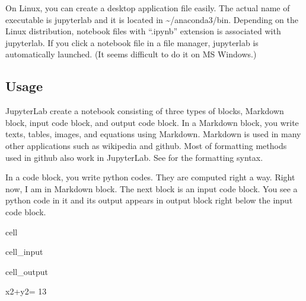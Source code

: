 \documentclass[letterpaper,10pt,english]{jupyterBook}
\begin{document}
\sphinxAtStartPar
On Linux, you can create a desktop application file easily.  The actual name of executable is jupyter\sphinxhyphen{}lab and it is located in \textasciitilde{}/anaconda3/bin.  Depending on the Linux distribution, notebook files with “.ipynb” extension is associated with jupyter\sphinxhyphen{}lab.  If you click a notebook file in a file manager,  jupyter\sphinxhyphen{}lab is automatically launched. (It seems difficult to do it on MS Windows.)


\subsection{Usage}
\label{\detokenize{preparation/jupyter:usage}}
\sphinxAtStartPar
JupyterLab create a notebook consisting of three types of blocks, Markdown block, input code block, and output code block.  In a Markdown block, you write texts, tables, images, and equations using Markdown. Markdown is used in many other applications such as wikipedia and github. Most of formatting methods used in github also work in JupyterLab.  See  for the formatting syntax.

\sphinxAtStartPar
In a code block, you write python codes. They are computed right a way. Right now, I am in Markdown block.  The next block is an input code block.  You see a python code in it and its output appears in output block right below the input code block.

\begin{sphinxuseclass}{cell}\begin{sphinxVerbatimInput}

\begin{sphinxuseclass}{cell_input}
\begin{sphinxVerbatim}[commandchars=\\\{\}]
\end{sphinxVerbatim}

\end{sphinxuseclass}\end{sphinxVerbatimInput}
\begin{sphinxVerbatimOutput}

\begin{sphinxuseclass}{cell_output}
\begin{sphinxVerbatim}[commandchars=\\\{\}]
x\PYGZca{}2+y\PYGZca{}2= 13
\end{sphinxVerbatim}

\end{sphinxuseclass}\end{sphinxVerbatimOutput}

\end{sphinxuseclass}
\end{document}
